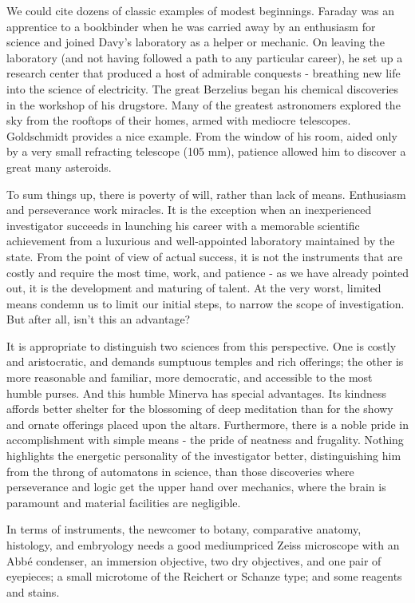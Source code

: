 \documentclass{article}
\begin{document}
We could cite dozens of classic examples of modest beginnings. Faraday was an apprentice to a bookbinder when he was carried away by an enthusiasm for science and joined Davy’s laboratory as a helper or mechanic. On leaving the laboratory (and not having followed a path to any particular career), he set up a research center that produced a host of admirable conquests - breathing new life into the science of electricity. The great Berzelius began his chemical discoveries in the workshop of his drugstore. Many of the greatest astronomers explored the sky from the rooftops of their homes, armed with mediocre telescopes. Goldschmidt provides a nice example. From the window of his room, aided only by a very small refracting telescope (105 mm), patience allowed him to discover a great many asteroids.

To sum things up, there is poverty of will, rather than lack of means. Enthusiasm and perseverance work miracles. It is the exception when an inexperienced investigator succeeds in launching his career with a memorable scientific achievement from a luxurious and well-appointed laboratory maintained by the state. From the point of view of actual success, it is not the instruments that are costly and require the most time, work, and patience - as we have already pointed out, it is the development and maturing of talent. At the very worst, limited means condemn us to limit our initial steps, to narrow the scope of investigation. But after all, isn’t this an advantage?

It is appropriate to distinguish two sciences from this perspective. One is costly and aristocratic, and demands sumptuous temples and rich offerings; the other is more reasonable and familiar, more democratic, and accessible to the most humble purses. And this humble Minerva has special advantages. Its kindness affords better shelter for the blossoming of deep meditation than for the showy and ornate offerings placed upon the altars. Furthermore, there is a noble pride in accomplishment with simple means - the pride of neatness and frugality. Nothing highlights the energetic personality of the investigator better, distinguishing him from the throng of automatons in science, than those discoveries where perseverance and logic get the upper hand over mechanics, where the brain is paramount and material facilities are negligible.

In terms of instruments, the newcomer to botany, comparative anatomy, histology, and embryology needs a good mediumpriced Zeiss microscope with an Abbé condenser, an immersion objective, two dry objectives, and one pair of eyepieces; a small microtome of the Reichert or Schanze type; and some reagents and stains.
\end{document}
